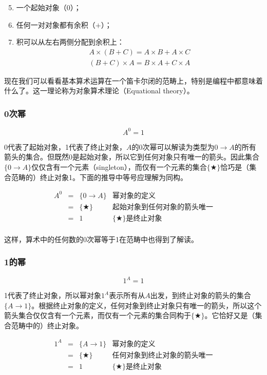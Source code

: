 \documentclass{article}
\begin{document}
\begin{enumerate}
  \setcounter{enumi}{4}
  \item 一个起始对象（0）；
  \item 任何一对对象都有余积（$+$）；
  \item 积可以从左右两侧分配到余积上：
  \[
  \begin{array}{l}
  A \times (B + C) = A \times B + A \times C \\
  (B + C) \times A = B \times A + C \times A
  \end{array}
  \]
\end{enumerate}

现在我们可以看看基本算术运算在一个笛卡尔闭的范畴上，特别是编程中都意味着什么了。这一理论称为对象算术理论（Equational theory）。

\subsubsection{0次幂}

\[
  A^0 = 1
\]

0代表了起始对象，1代表了终止对象，$A$的0次幂可以解读为类型为$0 \to A$的所有箭头的集合。但既然0是起始对象，所以它到任何对象只有唯一的箭头。因此集合$\{ 0 \to A \}$仅仅含有一个元素（singleton），而仅有一个元素的集合$\{ \bigstar \}$恰巧是（集合范畴的）终止对象1。下面的推导中等号应理解为同构。

\[
\begin{array}{rcll}
A^0 & = & \{ 0 \to A \} & \text{幂对象的定义} \\
    & = & \{ \bigstar \} & \text{起始对象到任何对象的箭头唯一} \\
    & = & 1 & \{ \bigstar \}\text{是终止对象} \\
\end{array}
\]

这样，算术中的任何数的0次幂等于1在范畴中也得到了解读。

\subsubsection{1的幂}

\[
  1^A = 1
\]

1代表了终止对象，所以幂对象$1^A$表示所有从$A$出发，到终止对象的箭头的集合$\{ A \to 1 \}$。根据终止对象的定义，任何对象到终止对象只有唯一的箭头，所以这个箭头集合仅仅含有一个元素，而仅有一个元素的集合同构于$\{ \bigstar \}$。它恰好又是（集合范畴中的）终止对象。

\[
\begin{array}{rcll}
1^A & = & \{ A \to 1 \} & \text{幂对象的定义} \\
    & = & \{ \bigstar \} & \text{任何对象到终止对象的箭头唯一} \\
    & = & 1 & \{ \bigstar \}\text{是终止对象} \\
\end{array}
\]
\end{document}
